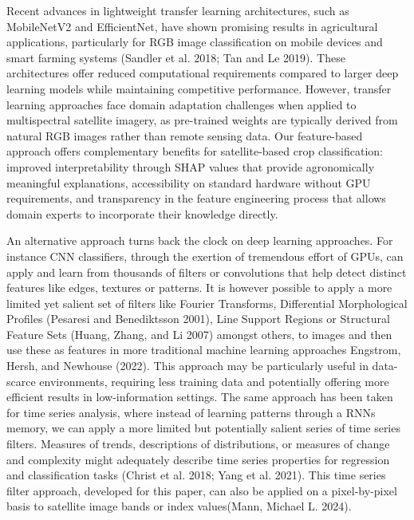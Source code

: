 \documentclass[
  journal,
  twocolumn]{IEEEtran}
\begin{document}
Recent advances in lightweight transfer learning architectures, such as
MobileNetV2 and EfficientNet, have shown promising results in
agricultural applications, particularly for RGB image classification on
mobile devices and smart farming systems (Sandler et al. 2018; Tan and
Le 2019). These architectures offer reduced computational requirements
compared to larger deep learning models while maintaining competitive
performance. However, transfer learning approaches face domain
adaptation challenges when applied to multispectral satellite imagery,
as pre-trained weights are typically derived from natural RGB images
rather than remote sensing data. Our feature-based approach offers
complementary benefits for satellite-based crop classification: improved
interpretability through SHAP values that provide agronomically
meaningful explanations, accessibility on standard hardware without GPU
requirements, and transparency in the feature engineering process that
allows domain experts to incorporate their knowledge directly.

An alternative approach turns back the clock on deep learning
approaches. For instance CNN classifiers, through the exertion of
tremendous effort of GPUs, can apply and learn from thousands of filters
or convolutions that help detect distinct features like edges, textures
or patterns. It is however possible to apply a more limited yet salient
set of filters like Fourier Transforms, Differential Morphological
Profiles (Pesaresi and Benediktsson 2001), Line Support Regions or
Structural Feature Sets (Huang, Zhang, and Li 2007) amongst others, to
images and then use these as features in more traditional machine
learning approaches Engstrom, Hersh, and Newhouse (2022). This approach
may be particularly useful in data-scarce environments, requiring less
training data and potentially offering more efficient results in
low-information settings. The same approach has been taken for time
series analysis, where instead of learning patterns through a RNNs
memory, we can apply a more limited but potentially salient series of
time series filters. Measures of trends, descriptions of distributions,
or measures of change and complexity might adequately describe time
series properties for regression and classification tasks (Christ et al.
2018; Yang et al. 2021). This time series filter approach, developed for
this paper, can also be applied on a pixel-by-pixel basis to satellite
image bands or index values(Mann, Michael L. 2024).
\end{document}
